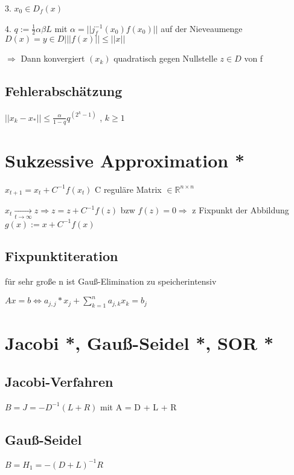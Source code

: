 \documentclass[12pt,a4paper]{article} %
\newcommand*\tab[1][1cm]{\hspace*{#1}}
\begin{document}
	3. $x_0 \in D_f(x)$
	
	4. $q := \frac{1}{2} \alpha \beta L$ mit $\alpha = ||j_f^{-1}(x_0)f(x_0)||$ auf der Nieveaumenge $D(x) = {y \in D | ||f(x) || \le ||x||}$
	
	$\Rightarrow$ Dann konvergiert $(x_k)$ quadratisch gegen Nullstelle $z \in D$ von f
	
	\subsection{Fehlerabschätzung}
	
	$||x_k - x_*|| \le \frac{\alpha}{1 - q}q^{(2^k - 1)}$ \tab , $k \ge 1$
	
	\section{Sukzessive Approximation *}
	
	$x_{t + 1} = x_t + C^{-1} f(x_t)$ \tab C reguläre Matrix $\in \mathbb{R}^{n \times n}$
	
	$x_t \xrightarrow[t \rightarrow \infty]{} z \Rightarrow z = z + C^{-1}f(z)$ bzw $f(z) = 0 \Rightarrow$ z Fixpunkt der Abbildung $g(x) := x + C^{-1}f(x)$
	
	\subsection{Fixpunktiteration}
	
	für sehr große n ist Gauß-Elimination zu speicherintensiv
	
	$Ax = b \Leftrightarrow a_{j, j} * x_j + \sum\limits_{k = 1}^na_{j, k}x_k = b_j$
	
	\section{Jacobi *, Gauß-Seidel *, SOR *}
	
	\subsection{Jacobi-Verfahren}
	
	$B = J = -D^{-1}(L + R)$ mit A = D + L + R
	
	\subsection{Gauß-Seidel}
	
	$B = H_1 = -(D + L)^{-1}R$
	
\end{document}
